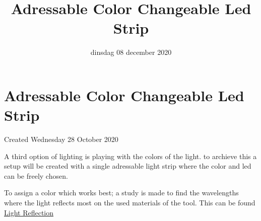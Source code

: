 \documentclass{scrartcl}
\title{Adressable Color Changeable Led Strip}
\date{dinsdag 08 december 2020}
\author{}
\begin{document}
\maketitle

		\section{Adressable Color Changeable Led Strip}

Created Wednesday 28 October 2020



A third option of lighting is playing with the colors of the light. to archieve this a setup will be created with a single adressable light strip where the color and led can be freely chosen. 



To assign a color which works best; a study is made to find the wavelengths where the light reflects most on the used materials of the tool. This can be found \href{../../Research/Light/Light_Reflection.tex}{Light Reflection}
\end{document}
